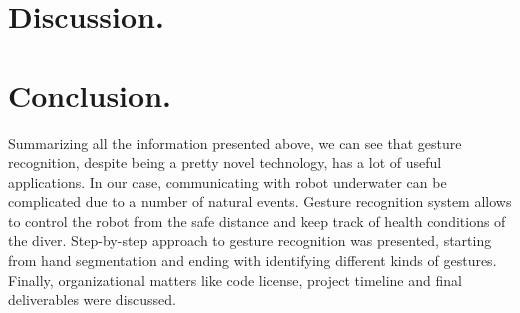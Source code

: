 \documentclass[a4paper,11pt,oneside]{article}
\begin{document}
%

%  

\section{Discussion.}
  
 \section{Conclusion.}

  Summarizing all the information presented above, we can see that gesture recognition, despite being a pretty novel technology, has a lot of useful applications. In our case, communicating with robot underwater can be complicated due to a number of natural events. Gesture recognition system allows to control the robot from the safe distance and keep track of health conditions of the diver. Step-by-step approach to gesture recognition was presented, starting from hand segmentation and ending with identifying different kinds of gestures. Finally, organizational matters like code license, project timeline and final deliverables were discussed.
  
\end{document}
